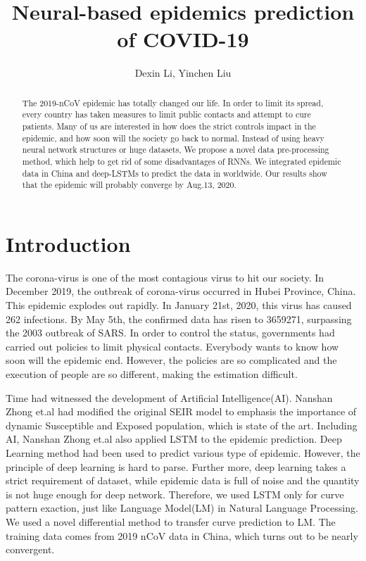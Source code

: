 \documentclass[]{article}
\title{Neural-based epidemics prediction of COVID-19}
\author{Dexin Li, Yinchen Liu}
\affil[1]{Shandong University}
\begin{document}
	

\maketitle

\begin{abstract}
\par
The 2019-nCoV epidemic has totally changed our life. In order to limit its spread, every country has taken measures to limit public contacts and attempt to cure patients. Many of us are interested in how does the strict controls impact in the epidemic, and how soon will the society go back to normal. Instead of using heavy neural network structures or huge datasets, We propose a novel data pre-processing method, which help to get rid of some disadvantages of RNNs. We integrated epidemic data in China and deep-LSTMs to predict the data in worldwide. Our results show that the epidemic will probably converge by Aug.13, 2020.
\end{abstract}

\section{Introduction}
\par
The corona-virus is one of the most contagious virus to hit our society. In December 2019, the outbreak of corona-virus occurred in Hubei Province, China. This epidemic explodes out rapidly. In January 21st, 2020, this virus has caused 262 infections. By May 5th, the confirmed data has risen to 3659271, surpassing the 2003 outbreak of SARS. In order to control the status, governments had carried out policies to limit physical contacts. Everybody wants to know how soon will the epidemic end. However, the policies are so complicated and the execution of people are so different, making the estimation difficult.
\par
Time had witnessed the development of Artificial Intelligence(AI). Nanshan Zhong et.al\cite{JTD36385} had modified the original SEIR model to emphasis the importance of dynamic Susceptible and Exposed population, which is state of the art. Including AI, Nanshan Zhong et.al also applied LSTM to the epidemic prediction. Deep Learning method had been used to predict various type of epidemic\cite{Liu2017Predicting}. However, the principle of deep learning is hard to parse. Further more, deep learning takes a strict requirement of dataset, while epidemic data is full of noise and the quantity is not huge enough for deep network. Therefore, we used LSTM only for curve pattern exaction, just like Language Model(LM) in Natural Language Processing. We used a novel differential method to transfer curve prediction to LM. The training data comes from 2019 nCoV data in China, which turns out to be nearly convergent.
\end{document}
